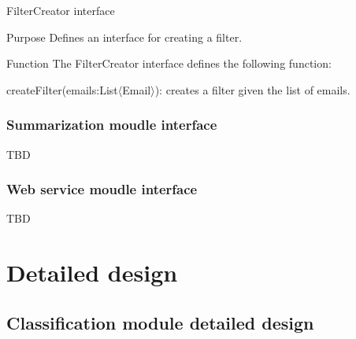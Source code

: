 \documentclass[12pt]{article}
\newenvironment{my_itemize}
{\begin{itemize}
  \setlength{\itemsep}{0cm}
  \setlength{\parskip}{0cm}}
{\end{itemize}}
\newenvironment{my_desc}
{\begin{description}
  \setlength{\itemsep}{0cm}
  \setlength{\parskip}{0cm}}
{\end{description}}
\begin{document}
\begin{my_itemize}
  \item FilterCreator interface
  \begin{my_desc}
   \item[Purpose] Defines an interface for creating a filter.
   \item[Function] The FilterCreator interface defines the following function:
	\begin{my_itemize}
	\item createFilter(emails:List$\langle$Email$\rangle$): creates a filter given the list of emails.
	\end{my_itemize}
  \end{my_desc}

\end{my_itemize}

\subsubsection{Summarization moudle interface}
TBD

\subsubsection{Web service moudle interface}
TBD

\section{Detailed design}

\subsection{Classification module detailed design}
\end{document}
